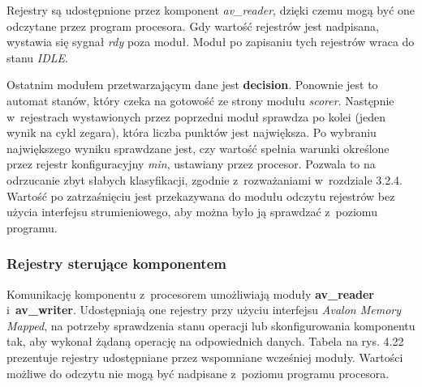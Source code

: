 Rejestry są udostępnione przez komponent \textit{av\_reader}, dzięki czemu mogą być one odczytane przez program procesora. Gdy wartość rejestrów jest nadpisana, wystawia się sygnał \textit{rdy} poza moduł. Moduł po zapisaniu tych rejestrów wraca do stanu \textit{IDLE}.

Ostatnim modułem przetwarzającym dane jest \textbf{decision}. Ponownie jest to automat stanów, który czeka na gotowość ze strony modułu \textit{scorer}. Następnie w~rejestrach wystawionych przez poprzedni moduł sprawdza po kolei (jeden wynik na cykl zegara), która liczba punktów jest największa. Po wybraniu największego wyniku sprawdzane jest, czy wartość spełnia warunki określone przez rejestr konfiguracyjny \textit{min}, ustawiany przez procesor. Pozwala to na odrzucanie zbyt słabych klasyfikacji, zgodnie z~rozważaniami w~rozdziale 3.2.4. Wartość po zatrzaśnięciu jest przekazywana do modułu odczytu rejestrów bez użycia interfejsu strumieniowego, aby można było ją sprawdzać z~poziomu programu.
 
 
\subsubsection{Rejestry sterujące komponentem}

Komunikację komponentu z~procesorem umożliwiają moduły \textbf{av\_reader} i~\textbf{av\_writer}. Udostępniają one rejestry przy użyciu interfejsu \textit{Avalon Memory Mapped}, na potrzeby sprawdzenia stanu operacji lub skonfigurowania komponentu tak, aby wykonał żądaną operację na odpowiednich danych. Tabela na rys. 4.22 prezentuje rejestry udostępniane przez wspomniane wcześniej moduły. Wartości możliwe do odczytu nie mogą być nadpisane z~poziomu programu procesora.

